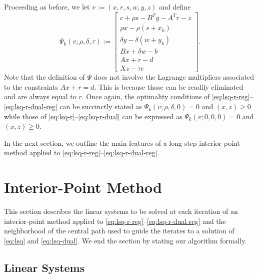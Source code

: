 \documentclass{amsart}
\begin{document}
Proceeding as before, we let $v := (x, r, s, w, y, z)$ and define
\begin{equation}
  \label{eq:def-psi}
  \Psi_k(v; \rho, \delta, \tau) :=
  \begin{bmatrix}
    c + \rho s - B^T y - A^T r - z \\
    \rho x - \rho (s + x_k) \\
    \delta y - \delta (w + y_k) \\
    Bx + \delta w - b \\
    Ax + r - d \\
    Xz - \tau e
  \end{bmatrix}.
\end{equation}
Note that the definition of $\Psi$ does not involve the Lagrange multipliers
associated to the constraints $Ax + r = d$. This is because those can be
readily eliminated and are always equal to $r$. Once again, the optimality
conditions of \eqref{eq:lsq-r-reg}--\eqref{eq:lsq-r-dual-reg} can be succinctly
stated as $\Psi_k(v; \rho, \delta, 0) = 0$ and $(x, z) \geq 0$ while
those of \eqref{eq:lsq-r}--\eqref{eq:lsq-r-dual} can be expressed as
$\Psi_k(v; 0, 0, 0) = 0$ and $(x, z) \geq 0$.

In the next section, we outline the main features of a long-step interior-point
method applied to \eqref{eq:lsq-r-reg}--\eqref{eq:lsq-r-dual-reg}.

\section{Interior-Point Method}

This section describes the linear systems to be solved at each iteration of an
interior-point method applied to
\eqref{eq:lsq-r-reg}--\eqref{eq:lsq-r-dual-reg} and the neighborhood of the
central path used to guide the iterates to a solution of \eqref{eq:lsq} and
\eqref{eq:lsq-dual}. We end the section by stating our algorithm formally.

\subsection{Linear Systems}
\end{document}
